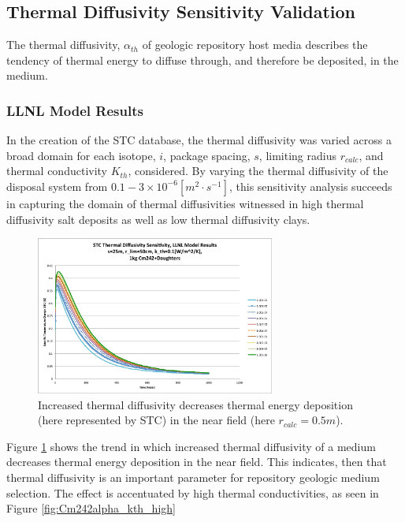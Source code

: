 \subsection{Thermal Diffusivity Sensitivity Validation}\label{sec:diffusivity}
The thermal diffusivity, $\alpha_{th}$ of geologic repository host media 
describes the tendency of thermal energy to diffuse through, and therefore be 
deposited, in the medium.

\FloatBarrier
\subsubsection{LLNL Model Results}

In the creation of the \gls{STC} database, the thermal diffusivity was varied 
across a broad domain for each isotope, $i$, package spacing, $s$, limiting 
radius $r_{calc}$, and thermal conductivity $K_{th}$, considered.  By 
varying the thermal diffusivity of the disposal system from $0.1-3\times 
10^{-6} [m^2\cdot s^{-1}]$, this sensitivity analysis succeeds in capturing the domain of 
thermal diffusivities witnessed in high thermal diffusivity salt deposits as 
well as low thermal diffusivity clays.

\begin{figure}[htbp!]
\begin{center}
\includegraphics[width=0.7\textwidth]{./chapters/demonstration/diffusivity/Cm242alpha_kth_low.eps}
\end{center}
\caption[$K_{th}$ Sensitivity to $\alpha_{th}$ for $k_{th}$]{Increased thermal diffusivity decreases thermal energy deposition 
(here represented by \gls{STC}) in the near field (here $r_{calc} = 0.5m$).}
\label{fig:Cm242alpha_kth_low}
\end{figure}


Figure \ref{fig:Cm242alpha_kth_low} shows the trend in which increased thermal diffusivity of a medium decreases thermal energy 
deposition in the near field. This indicates, then that thermal diffusivity is 
an important parameter for repository geologic medium selection. The effect is 
accentuated by high thermal conductivities, as seen in 
Figure \ref{fig:Cm242alpha_kth_high}

